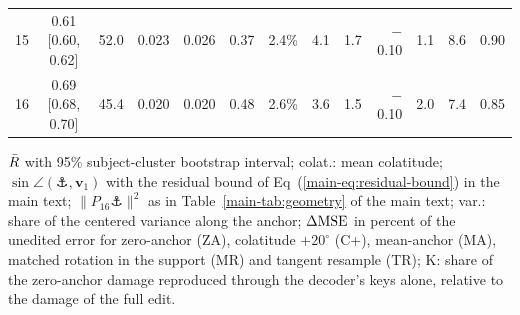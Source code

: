 \begin{table}[p]
\begin{tabular}{rcccccrrrrrrr}
15 & 0.61 [0.60, 0.62] & 52.0 & 0.023 & 0.026 & 0.37 & 2.4\% & 4.1 & 1.7 & $-$0.10 & 1.1 & 8.6 & 0.90 \\
16 & 0.69 [0.68, 0.70] & 45.4 & 0.020 & 0.020 & 0.48 & 2.6\% & 3.6 & 1.5 & $-$0.10 & 2.0 & 7.4 & 0.85 \\
\bottomrule
\end{tabular}
\begin{flushleft}\footnotesize $\bar{R}$ with 95\% subject-cluster bootstrap interval; colat.: mean colatitude; $\sin\angle(\anchor,\bm{v}_1)$ with the residual bound of Eq~(\ref{main-eq:residual-bound}) in the main text; $\|P_{16}\anchor\|^2$ as in Table~\ref{main-tab:geometry} of the main text; var.: share of the centered variance along the anchor; $\Delta\mathrm{MSE}$ in percent of the unedited error for zero-anchor (ZA), colatitude $+20^\circ$ (C+), mean-anchor (MA), matched rotation in the support (MR) and tangent resample (TR); K: share of the zero-anchor damage reproduced through the decoder's keys alone, relative to the damage of the full edit.\end{flushleft}
\end{table}

